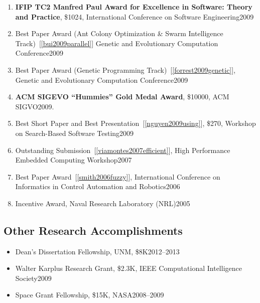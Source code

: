 \documentclass[11pt]{article}
\begin{document}
\begin{enumerate}
\item \textbf{IFIP TC2 Manfred Paul Award for Excellence in Software: Theory and Practice}, \$1024, International Conference on Software Engineering\hfill 2009

\item Best Paper Award (Ant Colony Optimization \& Swarm Intelligence Track)~[\ref{bui2009parallel}] Genetic and Evolutionary Computation Conference\hfill 2009
\item Best Paper Award (Genetic Programming Track)~[\ref{forrest2009genetic}], Genetic and Evolutionary Computation Conference\hfill 2009
\item \textbf{ACM SIGEVO “Hummies” Gold Medal Award}, \$10000, ACM SIGVO\hfill 2009.
\item Best Short Paper and Best Presentation~[\ref{nguyen2009using}], \$270, Workshop on Search-Based Software Testing\hfill 2009
\item Outstanding Submission~[\ref{viamontes2007efficient}], High Performance Embedded Computing Workshop\hfill 2007
\item  Best Paper Award~[\ref{smith2006fuzzy}],  International Conference on Informatics in Control Automation and Robotics\hfill 2006
\item Incentive Award,  Naval Research Laboratory (NRL)\hfill 2005
\end{enumerate}

\subsection{Other Research Accomplishments}
\begin{itemize}
\item Dean's Dissertation Fellowship, UNM, \$8K\hfill 2012--2013
\item Walter Karplus Research Grant, \$2.3K, IEEE Computational Intelligence Society\hfill 2009 
\item Space Grant Fellowship, \$15K, NASA\hfill 2008--2009 
\end{itemize}
\end{document}
